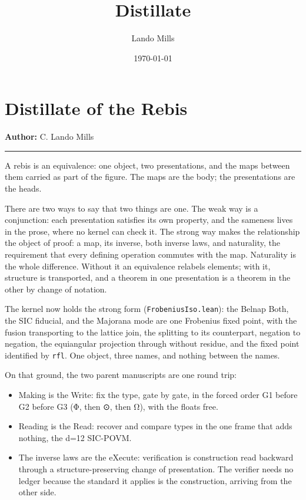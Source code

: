 \documentclass[12pt,a4paper]{article}
\title{Distillate}
\date{\today}
\author{Lando Mills}
\begin{document}
\maketitle
\hypertarget{distillate-of-the-rebis}{%
\section{Distillate of the Rebis}\label{distillate-of-the-rebis}}

\textbf{Author:} C. Lando Mills

\begin{center}\rule{0.5\linewidth}{0.5pt}\end{center}

A rebis is an equivalence: one object, two presentations, and the maps
between them carried as part of the figure. The maps are the body; the
presentations are the heads.

There are two ways to say that two things are one. The weak way is a
conjunction: each presentation satisfies its own property, and the
sameness lives in the prose, where no kernel can check it. The strong
way makes the relationship the object of proof: a map, its inverse, both
inverse laws, and naturality, the requirement that every defining
operation commutes with the map. Naturality is the whole difference.
Without it an equivalence relabels elements; with it, structure is
transported, and a theorem in one presentation is a theorem in the other
by change of notation.

The kernel now holds the strong form (\texttt{FrobeniusIso.lean}): the
Belnap Both, the SIC fiducial, and the Majorana mode are one Frobenius
fixed point, with the fusion transporting to the lattice join, the
splitting to its counterpart, negation to negation, the equiangular
projection through without residue, and the fixed point identified by
\texttt{rfl}. One object, three names, and nothing between the names.

On that ground, the two parent manuscripts are one round trip:

\begin{itemize}
\tightlist
\item
  Making is the Write: fix the type, gate by gate, in the forced order
  G1 before G2 before G3 (Φ, then ⊙, then Ω), with the floats free.
\item
  Reading is the Read: recover and compare types in the one frame that
  adds nothing, the d=12 SIC-POVM.
\item
  The inverse laws are the eXecute: verification is construction read
  backward through a structure-preserving change of presentation. The
  verifier needs no ledger because the standard it applies is the
  construction, arriving from the other side.
\end{itemize}
\end{document}
